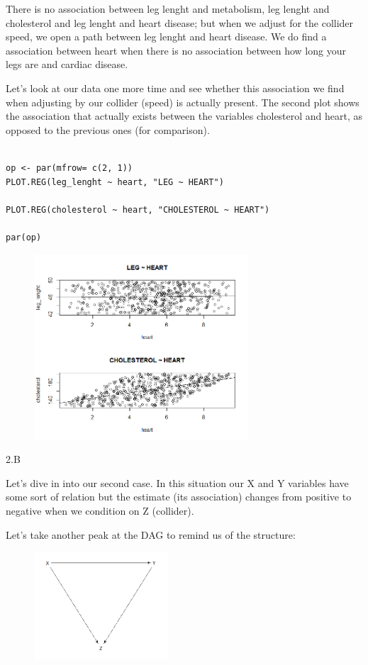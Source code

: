 \documentclass{article}
\begin{document}
There is no association between leg lenght and metabolism, leg lenght and  cholesterol and leg lenght and heart disease; but when we adjust for the  collider speed, we open a path between leg lenght and heart disease. We  do find  a association between heart when there is no association between  how long your legs are and cardiac disease.

Let's look at our data one more time and see whether this association we find when adjusting by our collider (speed) is actually present. The second plot shows the association that actually exists between the variables cholesterol and heart, as opposed to the previous ones (for comparison).


\begin{lstlisting}

op <- par(mfrow= c(2, 1))
PLOT.REG(leg_lenght ~ heart, "LEG ~ HEART")

PLOT.REG(cholesterol ~ heart, "CHOLESTEROL ~ HEART")

par(op)
\end{lstlisting}

\begin{figure}[h]
\includegraphics[width=8cm]{COMP_LEG_CHOL_HEART.png}
\centering
\end{figure}
\smallskip


\bigskip
2.B
\smallskip

Let's dive in into our second case. In this situation our X and Y variables have some sort of relation but the estimate (its association) changes from positive to negative when we condition on Z (collider).
\smallskip

Let's take another peak at the DAG to remind us of the structure:

\begin{figure}[h]
\includegraphics[width=5cm]{DAG_Situation2.png}
\centering
\end{figure}
\end{document}
